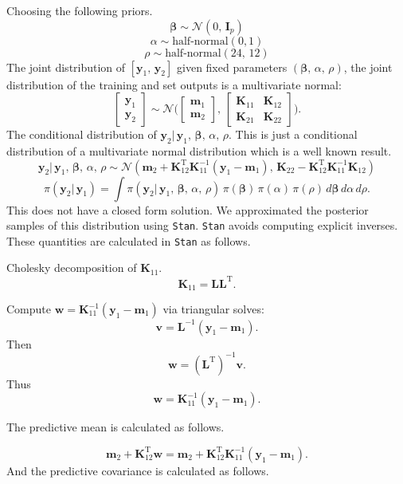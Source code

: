 \documentclass[
]{article}
\begin{document}
Choosing the following priors.
\[\boldsymbol{\beta} \sim \mathcal{N}(0,\, \mathbf{I}_{p})\]
\[\alpha \sim \text{half-normal}(0, 1)\]
\[\rho \sim \text{half-normal}(24,\, 12)\] The joint distribution of
\([\mathbf{y}_{1},\, \mathbf{y}_{2}]\) given fixed parameters
\((\boldsymbol{\beta},\, \alpha,\, \rho)\), the joint distribution of
the training and set outputs is a multivariate normal:
\[\begin{bmatrix} \mathbf{y}_{1} \\ \mathbf{y}_{2} \end{bmatrix} \sim \mathcal{N} \Bigg(\begin{bmatrix} \mathbf{m}_{1} \\ \mathbf{m}_{2} \end{bmatrix},\, \begin{bmatrix} \mathbf{K}_{11} & \mathbf{K}_{12} \\ \mathbf{K}_{21} & \mathbf{K}_{22} \end{bmatrix} \Bigg).\]
The conditional distribution of
\(\mathbf{y}_{2}|\, \mathbf{y}_{1},\, \boldsymbol{\beta},\, \alpha,\, \rho\).
This is just a conditional distribution of a multivariate normal
distribution which is a well known result.
\[\mathbf{y}_{2}|\, \mathbf{y}_{1},\, \boldsymbol{\beta},\, \alpha,\, \rho \sim \mathcal{N}(\mathbf{m}_{2} + \mathbf{K}_{12}^{\text{T}}\mathbf{K}_{11}^{-1}(\mathbf{y}_{1} - \mathbf{m}_{1}),\, \mathbf{K}_{22} - \mathbf{K}_{12}^{\text{T}} \mathbf{K}_{11}^{-1} \mathbf{K}_{12})\]
\[\pi(\mathbf{y}_{2}|\, \mathbf{y}_{1}) = \int \pi(\mathbf{y}_{2}|\, \mathbf{y}_{1},\, \boldsymbol{\beta},\, \alpha,\, \rho) \, \pi(\boldsymbol{\beta}) \, \pi(\alpha) \, \pi(\rho) \,  d\boldsymbol{\beta}\, d\alpha\, d\rho.\]
This does not have a closed form solution. We approximated the posterior
samples of this distribution using \texttt{Stan}. \texttt{Stan} avoids
computing explicit inverses. These quantities are calculated in
\texttt{Stan} as follows.

Cholesky decomposition of \(\mathbf{K}_{11}\).
\[\mathbf{K}_{11} = \mathbf{L} \mathbf{L}^{\text{T}}.\]

Compute
\(\mathbf{w} = \mathbf{K}_{11}^{-1}(\mathbf{y}_{1} - \mathbf{m}_{1})\)
via triangular solves:
\[\mathbf{v} = \mathbf{L}^{-1}(\mathbf{y}_{1} - \mathbf{m}_{1}).\] Then
\[\mathbf{w} = (\mathbf{L}^{\text{T}})^{-1} \mathbf{v}.\] Thus
\[\mathbf{w} = \mathbf{K}_{11}^{-1}(\mathbf{y}_{1} - \mathbf{m}_{1}).\]

The predictive mean is calculated as follows.

\[\mathbf{m}_{2} + \mathbf{K}_{12}^{\text{T}}\mathbf{w} = \mathbf{m}_{2} + \mathbf{K}_{12}^{\text{T}}\mathbf{K}_{11}^{-1}(\mathbf{y}_{1} - \mathbf{m}_{1}).\]
And the predictive covariance is calculated as follows.
\end{document}
